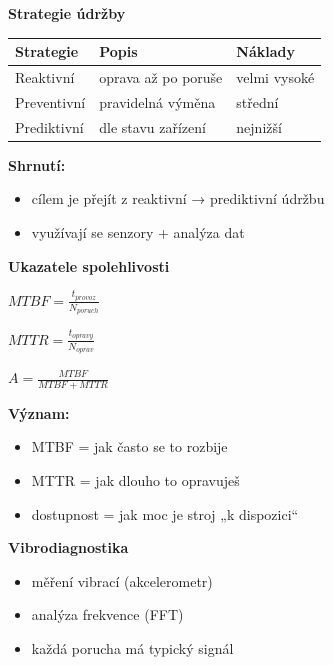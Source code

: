 \documentclass[a4paper,10pt]{article}
\begin{document}
\begin{vysvetlenibox}

\textbf{Strategie údržby}

\begin{center}
\begin{tabularx}{0.95\linewidth}{l X X}
Strategie & Popis & Náklady \\
\hline
Reaktivní & oprava až po poruše & velmi vysoké \\
Preventivní & pravidelná výměna & střední \\
Prediktivní & dle stavu zařízení & nejnižší \\
\end{tabularx}
\end{center}

\textbf{Shrnutí:}
\begin{itemize}
\item cílem je přejít z reaktivní → prediktivní údržbu
\item využívají se senzory + analýza dat
\end{itemize}

\textbf{Ukazatele spolehlivosti}

\begin{vzorcebox}
$MTBF = \frac{t_{provoz}}{N_{poruch}}$

$MTTR = \frac{t_{opravy}}{N_{oprav}}$

$A = \frac{MTBF}{MTBF + MTTR}$
\end{vzorcebox}

\textbf{Význam:}
\begin{itemize}
\item MTBF = jak často se to rozbije
\item MTTR = jak dlouho to opravuješ
\item dostupnost = jak moc je stroj „k dispozici“
\end{itemize}

\textbf{Vibrodiagnostika}

\begin{itemize}
\item měření vibrací (akcelerometr)
\item analýza frekvence (FFT)
\item každá porucha má typický signál
\end{itemize}


\end{vysvetlenibox}
\end{document}
